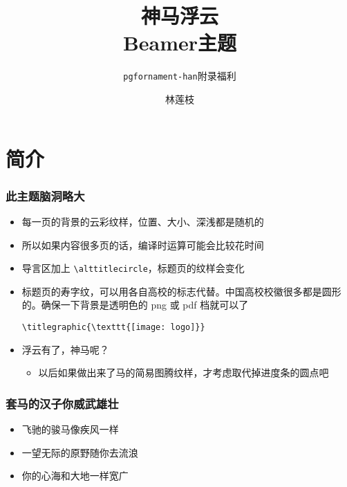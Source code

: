 \documentclass{ctexbeamer}
\author{林莲枝}
\title{神马浮云\\Beamer主题}
\subtitle{\texttt{pgfornament-han}附录福利}
\begin{document}
\begin{frame}[noframenumbering]
  \maketitle
\end{frame}

\section{简介}

\begin{frame}
  \frametitle{此主题脑洞略大}

  \begin{itemize}
    \item 每一页的背景的云彩纹样，位置、大小、深浅都是随机的
    \item 所以如果内容很多页的话，编译时运算可能会比较花时间
    \item 导言区加上 \verb|\alttitlecircle|，标题页的纹样会变化

    \framebreak
    \item 标题页的寿字纹，可以用各自高校的标志代替。中国高校校徽很多都是圆形的。确保一下背景是透明色的 png 或 pdf 档就可以了

    \verb|\titlegraphic{\texttt{[image: logo]}}|

    \medskip

    \item 浮云有了，神马呢？
      \begin{itemize}
        \item 以后如果做出来了马的简易图腾纹样，才考虑取代掉进度条的圆点吧
      \end{itemize}
  \end{itemize}

\end{frame}

\begin{frame}
  \frametitle{套马的汉子你威武雄壮}

  \begin{itemize}
    \item 飞驰的骏马像疾风一样
    \item 一望无际的原野随你去流浪
    \item 你的心海和大地一样宽广
  \end{itemize}

\end{frame}
\end{document}
